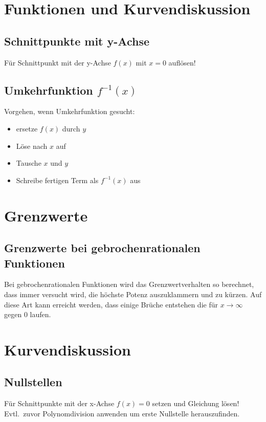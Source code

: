 \documentclass[12pt, a4paper]{scrreprt}
\begin{document}
\begin{figure}[H]
  \centering
  \subfloat[Logarithmusfunktionen]{}\hfill%
  \subfloat[Wurzelfunktion]{}
\end{figure}

\chapter{Funktionen und Kurvendiskussion}
\section{Schnittpunkte mit y-Achse}
Für Schnittpunkt mit der y-Achse \(f(x)\) mit \(x=0\) auflösen!

\section{Umkehrfunktion \(f^{-1}(x)\)}
Vorgehen, wenn Umkehrfunktion gesucht:

\begin{itemize}
\item ersetze \(f(x)\) durch \(y\)
\item Löse nach \(x\) auf
\item Tausche \(x\) und \(y\)
\item Schreibe fertigen Term als \(f^{-1}(x)\) aus
\end{itemize}

\chapter{Grenzwerte}

\section{Grenzwerte bei gebrochenrationalen Funktionen}

Bei gebrochenrationalen Funktionen wird das Grenzwertverhalten so berechnet, dass immer versucht wird, die höchste Potenz auszuklammern und zu kürzen. Auf diese Art kann erreicht werden, dass einige Brüche entstehen die für \(x \rightarrow \infty\) gegen 0 laufen.

\chapter{Kurvendiskussion}

\section{Nullstellen}
Für Schnittpunkte mit der x-Achse \(f(x)=0\) setzen und Gleichung lösen!\\
Evtl.\ zuvor Polynomdivision anwenden um erste Nullstelle herauszufinden.
\end{document}
